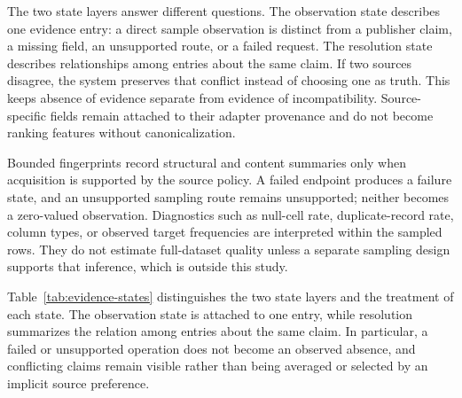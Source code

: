 \documentclass[conference]{IEEEtran}
\begin{document}
The two state layers answer different questions. The observation state describes one evidence entry: a direct sample observation is distinct from a publisher claim, a missing field, an unsupported route, or a failed request. The resolution state describes relationships among entries about the same claim. If two sources disagree, the system preserves that conflict instead of choosing one as truth. This keeps absence of evidence separate from evidence of incompatibility. Source-specific fields remain attached to their adapter provenance and do not become ranking features without canonicalization.

Bounded fingerprints record structural and content summaries only when acquisition is supported by the source policy. A failed endpoint produces a failure state, and an unsupported sampling route remains unsupported; neither becomes a zero-valued observation. Diagnostics such as null-cell rate, duplicate-record rate, column types, or observed target frequencies are interpreted within the sampled rows. They do not estimate full-dataset quality unless a separate sampling design supports that inference, which is outside this study.

Table~\ref{tab:evidence-states} distinguishes the two state layers and the treatment of each state. The observation state is attached to one entry, while resolution summarizes the relation among entries about the same claim. In particular, a failed or unsupported operation does not become an observed absence, and conflicting claims remain visible rather than being averaged or selected by an implicit source preference.
\end{document}
